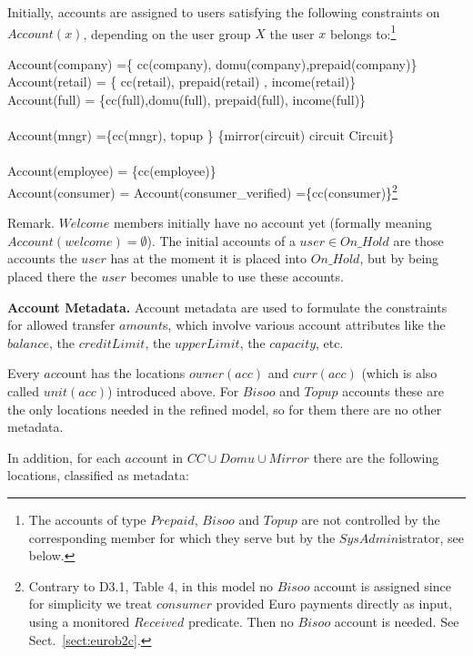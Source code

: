 Initially, accounts are assigned to users satisfying the following constraints on $Account(x)$, depending on the user group $X$ the user $x$ belongs to:\footnote{The accounts of type $Prepaid$, $Bisoo$ and $Topup$ are not controlled by the corresponding member for which they serve but by the $SysAdmin$istrator, see below.
}

\begin{asm}
Account(company) =\{ cc(company), domu(company),prepaid(company)\}  \\
Account(retail) = \{ cc(retail), prepaid(retail) , income(retail)\}\\
Account(full) =
\{cc(full),domu(full), prepaid(full), income(full)\}\\ 
\\
 Account(mngr) =\{cc(mngr), topup \} \cup 
    \{mirror(circuit) \mid circuit \in Circuit\}\\
\\
Account(employee) = \{cc(employee)\}\\
Account(consumer) = Account(consumer\_verified)              
              =\{cc(consumer)\}\footnote{Contrary to D3.1, Table 4, in this model no $Bisoo$ account is assigned since for simplicity we treat $consumer$ provided Euro payments directly as input, using a monitored $Received$ predicate. Then no $Bisoo$ account is needed. See Sect.~\ref{sect:eurob2c}.}
\end{asm}

Remark. $Welcome$ members initially have no account yet (formally meaning  $Account(welcome)=\emptyset$). The initial accounts of a 
$user \in On\_Hold$ are those accounts the $user$ has at the moment it is placed into $On\_Hold$, but by being placed there the $user$ becomes unable to use these accounts.

{\bf Account Metadata.} Account metadata are used to formulate the constraints for allowed transfer $amount$s, which involve various account attributes like the $balance$, the $creditLimit$, the $upperLimit$, the $capacity$, etc. 

Every $acc$ount has the locations $owner(acc)$ and $curr(acc)$ (which is also called $unit(acc)$) introduced above. For $Bisoo$ and $Topup$ accounts these are the only locations needed in the refined model, so for them there are no other metadata. 

In addition, for each $acc$ount in $CC \cup Domu \cup Mirror$ there are the following locations, classified as metadata:

